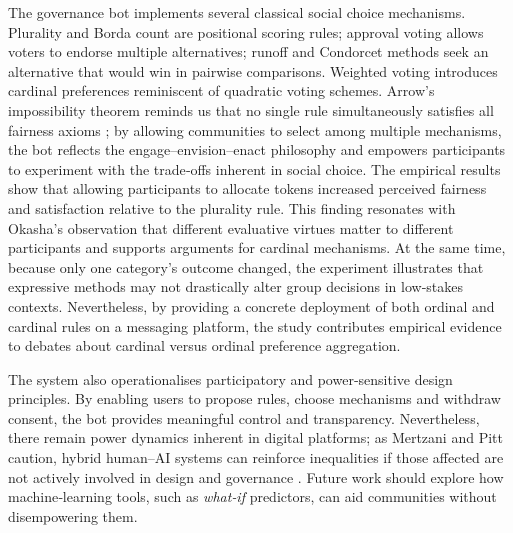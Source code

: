 The governance bot implements several classical social choice mechanisms.
Plurality and Borda count are positional scoring rules; approval voting
allows voters to endorse multiple alternatives; runoff and Condorcet methods
seek an alternative that would win in pairwise comparisons.  Weighted
voting introduces cardinal preferences reminiscent of quadratic voting
schemes.  Arrow’s impossibility theorem reminds us that no single rule
simultaneously satisfies all fairness axioms \cite{Arrow1951}; by allowing
communities to select among multiple mechanisms, the bot reflects the
engage–envision–enact philosophy and empowers participants to experiment
with the trade‑offs inherent in social choice.  The empirical results show
that allowing participants to allocate tokens increased perceived fairness
and satisfaction relative to the plurality rule.  This finding resonates
with Okasha’s observation that different evaluative virtues matter to
different participants \cite{Okasha2011} and supports arguments for
cardinal mechanisms.  At the same time, because only one category’s
outcome changed, the experiment illustrates that expressive methods may not
drastically alter group decisions in low‑stakes contexts.  Nevertheless, by
providing a concrete deployment of both ordinal and cardinal rules on a
messaging platform, the study contributes empirical evidence to debates
about cardinal versus ordinal preference aggregation.

The system also operationalises participatory and power‑sensitive design
principles.  By enabling users to propose rules, choose mechanisms and
withdraw consent, the bot provides meaningful control and transparency.
Nevertheless, there remain power dynamics inherent in digital platforms; as
Mertzani and Pitt caution, hybrid human–AI systems can reinforce
inequalities if those affected are not actively involved in design and
governance \cite{Mertzani2025SGML}.  Future work should explore how
machine‑learning tools, such as \emph{what‑if} predictors, can aid
communities without disempowering them.
